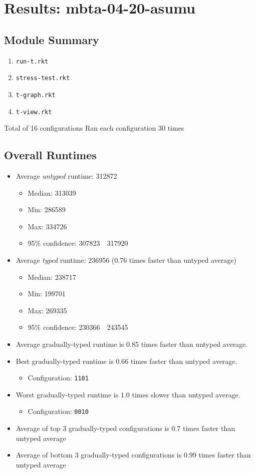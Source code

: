 \documentclass{article}
\newcommand{\mono}[1]{\texttt{#1}}
\begin{document}


\section{Results: mbta-04-20-asumu}

\subsection{Module Summary}
\begin{enumerate}
\item \mono{run-t.rkt}
\item \mono{stress-test.rkt}
\item \mono{t-graph.rkt}
\item \mono{t-view.rkt}\end{enumerate}
Total of 16 configurations
Ran each configuration 30 times

\subsection{Overall Runtimes}
\begin{itemize}
\item Average \emph{untyped} runtime: 312872
  \begin{itemize}
  \item Median: 313039
  \item Min: 286589
  \item Max: 334726
  \item 95\% confidence: 307823~\textendash~317920\end{itemize}
\item Average \emph{typed} runtime: 236956 (0.76 times faster than untyped average)
  \begin{itemize}
  \item Median: 238717
  \item Min: 199701
  \item Max: 269335
  \item 95\% confidence: 230366~\textendash~243545
\end{itemize}
\item Average gradually-typed runtime is 0.85 times faster than untyped average.
\item Best gradually-typed runtime is 0.66 times faster than untyped average.
\begin{itemize}\item Configuration: \mono{1101}\end{itemize}
\item Worst gradually-typed runtime is 1.0 times slower than untyped average.
\begin{itemize}\item Configuration: \mono{0010}\end{itemize}
\item Average of top 3 gradually-typed configurations is 0.7 times faster than untyped average
\item Average of bottom 3 gradually-typed configurations is 0.99 times faster than untyped average
\end{itemize}
\end{document}
